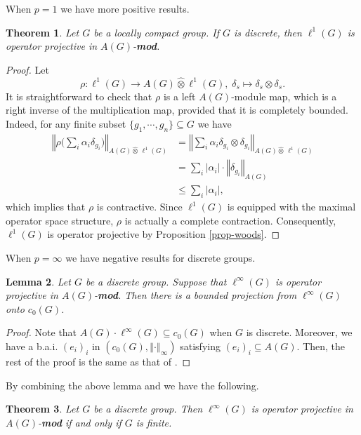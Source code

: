 \documentclass[10pt]{amsart}
\newtheorem{thm}{Theorem}
\newtheorem{lem}[thm]{Lemma}
\numberwithin{thm}{section}
\numberwithin{equation}{section}
\begin{document}
When $p=1$ we have more positive results.
	\begin{thm}\label{thm-comL1}
	Let $G$ be a locally compact group. If $G$ is discrete,
	then $\ell^1(G)$ is operator projective in $A(G)$-{\bf mod}.
	\end{thm}
\begin{proof}
Let
	$$\rho : \ell^1(G) \rightarrow A(G) {\widehat{\otimes}} \ell^1(G),\; \delta_s \mapsto \delta_s \otimes \delta_s.$$
It is straightforward to check that $\rho$ is a left $A(G)$-module map, which is a right inverse of the multiplication map, provided that it is completely bounded.
Indeed, for any finite subset $\{g_1, \cdots, g_n\} \subseteq G$ we have
	\begin{align*}
	{\left\Vert{\rho \Big(\sum_i \alpha_i \delta_{g_i}\Big)}\right\Vert}_{A(G) {\widehat{\otimes}} \,\ell^1(G)}
	& = {\left\Vert{\sum_i \alpha_i \delta_{g_i}\otimes \delta_{g_i}}\right\Vert}_{A(G) {\widehat{\otimes}} \, \ell^1(G)}\\
	& = \sum_i {\left\vert{\alpha_i}\right\vert}\cdot {\left\Vert{\delta_{g_i}}\right\Vert}_{A(G)}\\
	& \le \sum_i {\left\vert{\alpha_i}\right\vert},
	\end{align*}
which implies that $\rho$ is contractive.
Since $\ell^1(G)$ is equipped with the maximal operator space structure, $\rho$ is actually a complete contraction. 
Consequently, $\ell^1(G)$ is operator projective by Proposition \ref{prop-woods}.

\end{proof}

When $p=\infty$ we have negative results for discrete groups.
	\begin{lem}\label{lem-proj-com}
	Let $G$ be a discrete group. Suppose that $\ell^\infty(G)$ is operator projective in $A(G)$-{\bf mod}.
	Then there is a bounded projection from $\ell^\infty(G)$ onto $c_0(G)$.
	\end{lem}  
\begin{proof}
Note that $A(G) \cdot \ell^\infty(G) \subseteq c_0(G)$ when $G$ is discrete.
Moreover, we have a b.a.i. $(e_i)_i$ in $(c_0(G), {\left\Vert{\cdot}\right\Vert}_\infty)$ satisfying $(e_i)_i \subseteq A(G)$.
Then, the rest of the proof is the same as that of \cite[Lemma 3.2]{DP04}.
\end{proof}

By combining the above lemma and \cite[Corollary 3]{LL90} we have the following.
	\begin{thm}\label{thm-ell-infty}
	Let $G$ be a discrete group. Then $\ell^\infty(G)$ is operator projective in $A(G)$-{\bf mod} if and only if $G$ is finite.
	\end{thm}
\end{document}
